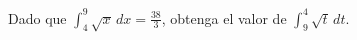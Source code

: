 \item Dado que $\displaystyle \int_4^9 \sqrt{x} \, dx = \frac{38}{3}$, obtenga el valor de $\displaystyle \int_9^4 \sqrt{t} \, dt$.
